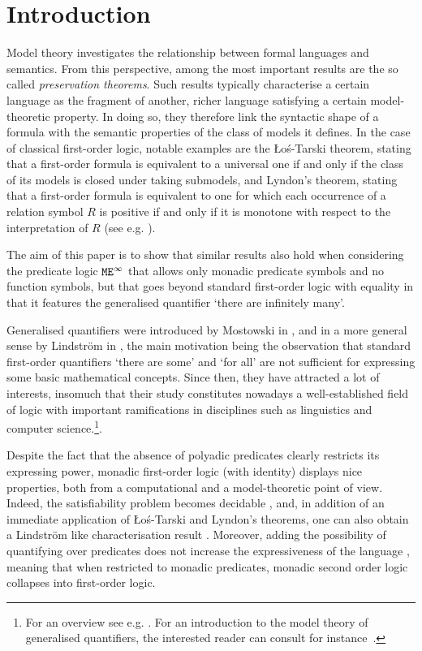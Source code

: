 
\section{Introduction}\label{sec:intro}

Model theory investigates the relationship between formal languages and 
semantics. 
From this perspective, among the most important results are the so called 
\emph{preservation theorems}. 
Such results typically characterise a certain language as the fragment of 
another, richer language satisfying a certain model-theoretic property.
In doing so, they therefore  link the syntactic shape of a formula with the 
semantic properties of the class of models  it defines. 
In the case of classical first-order logic, notable examples are the 
{\L}o\'s-Tarski theorem,  stating that a first-order  formula is equivalent to a universal one if and only if the class of its models is closed under taking submodels, and Lyndon's theorem, stating that a first-order formula is equivalent to  one for which each occurrence of a relation symbol $R$  is positive if and only if it is monotone with respect to the interpretation of $R$ (see e.g. \cite{Hodges1993}).

The aim of this paper is to show that similar results also hold when considering the predicate logic $\mathtt{M}\mathtt{E}^{\infty}$ that allows only monadic predicate symbols and no function symbols, but that goes beyond standard first-order logic with equality in that it features the generalised quantifier `there are infinitely many'. 
 
Generalised quantifiers were introduced by Mostowski in \cite{Mostowski1957}, 
and in a more general sense by Lindstr\"{o}m in \cite{perlindstrom1966first},
the main motivation being the observation that standard first-order quantifiers 
`there are some' and `for all' are not sufficient for expressing some basic 
mathematical concepts. 
Since then, they have attracted a lot of interests, insomuch that their study
constitutes nowadays a well-established field of logic with important 
ramifications in disciplines such as linguistics and computer 
science.\footnote{%
   For an overview see e.g. 
   \cite{van1995directions,vaananen1997generalized,sep-generalized-quantifiers}.
   For an introduction to the model theory of generalised quantifiers, the 
   interested reader can consult for 
   instance~\cite[Chapter~10]{vaananen2011models}.
   }. 


Despite the fact that the absence of polyadic predicates clearly restricts its expressing power, monadic first-order logic (with identity) displays nice properties, both from a computational and a model-theoretic point of view. Indeed, the  
satisfiability problem becomes decidable  \cite{Behmann1922,Loewenheim1915}, and, in addition of an immediate application of {\L}o\'s-Tarski  and Lyndon's theorems, one can also obtain a Lindstr\"om like characterisation result  \cite{tharp1973characterization}.
Moreover, adding the possibility of quantifying over predicates does not increase the expressiveness of the language \cite{ackermann1954solvable}, meaning that when restricted to monadic predicates, monadic second order logic collapses into first-order logic. 

